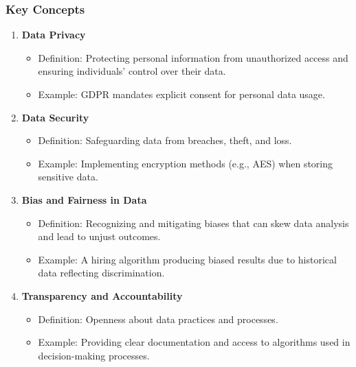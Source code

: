 \documentclass[aspectratio=169]{beamer}
\begin{document}
\begin{frame}[fragile]
    \frametitle{Key Concepts}
    \begin{enumerate}
        \item \textbf{Data Privacy}
            \begin{itemize}
                \item Definition: Protecting personal information from unauthorized access and ensuring individuals' control over their data.
                \item Example: GDPR mandates explicit consent for personal data usage.
            \end{itemize}
        
        \item \textbf{Data Security}
            \begin{itemize}
                \item Definition: Safeguarding data from breaches, theft, and loss.
                \item Example: Implementing encryption methods (e.g., AES) when storing sensitive data.
            \end{itemize}

        \item \textbf{Bias and Fairness in Data}
            \begin{itemize}
                \item Definition: Recognizing and mitigating biases that can skew data analysis and lead to unjust outcomes.
                \item Example: A hiring algorithm producing biased results due to historical data reflecting discrimination.
            \end{itemize}

        \item \textbf{Transparency and Accountability}
            \begin{itemize}
                \item Definition: Openness about data practices and processes.
                \item Example: Providing clear documentation and access to algorithms used in decision-making processes.
            \end{itemize}
    \end{enumerate}
\end{frame}
\end{document}
